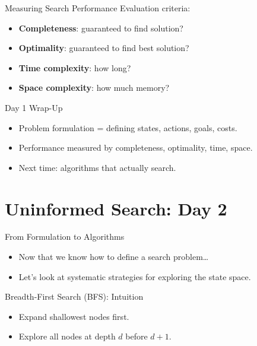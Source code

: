 \documentclass[aspectratio=169]{beamer}
\begin{document}
\begin{frame}{Measuring Search Performance}
  Evaluation criteria:
  \begin{itemize}
    \item \textbf{Completeness}: guaranteed to find solution? 
    \item \textbf{Optimality}: guaranteed to find best solution? 
    \item \textbf{Time complexity}: how long? 
    \item \textbf{Space complexity}: how much memory? 
  \end{itemize}
\end{frame}

\begin{frame}{Day 1 Wrap-Up}
  \begin{itemize}
    \item Problem formulation = defining states, actions, goals, costs.
    \item Performance measured by completeness, optimality, time, space.
    \item Next time: algorithms that actually search.
  \end{itemize}
\end{frame}


\section{Uninformed Search: Day 2}

\begin{frame}{From Formulation to Algorithms}
  \begin{itemize}
    \item Now that we know how to define a search problem…
    \item Let’s look at systematic strategies for exploring the state space.
  \end{itemize}
\end{frame}

\begin{frame}{Breadth-First Search (BFS): Intuition}
  \begin{minipage}{0.55\textwidth}
    \begin{itemize}
      \item Expand shallowest nodes first.
      \item Explore all nodes at depth $d$ before $d+1$.
    \end{itemize}
  \end{minipage}%
  \begin{minipage}{0.43\textwidth}
  \end{minipage}
\end{frame}
\end{document}
